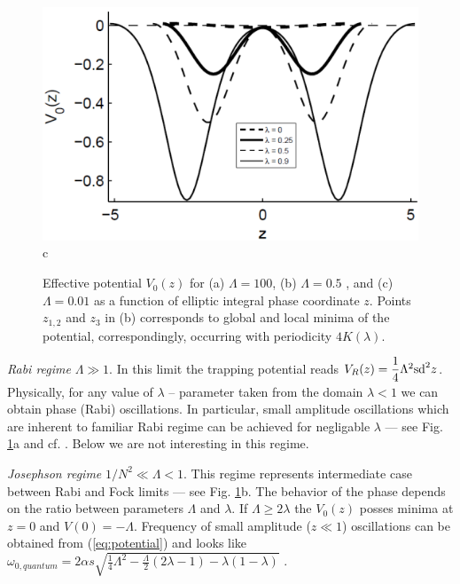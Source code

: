\documentclass[aps, pre, preprint, groupedaddress, superscriptaddress, showkeys, showpacs] {revtex4-1}
\begin{document}
\begin{figure}[ht]
\begin{minipage}[htbp]{0.32\linewidth}	{\includegraphics[width=1\linewidth]{pic/potential_L=001.png} \\ c}
\end{minipage}
\caption{
Effective potential $V_0(z)$ for (a) $\Lambda = 100$, (b) $\Lambda = 0.5$ , and (c) $\Lambda = 0.01$ as a function of  elliptic integral phase coordinate $z$.
Points $z_{1,2}$ and $z_{3}$ in (b) corresponds to global and local minima of the potential, correspondingly,  occurring with periodicity $4K(\lambda)$. \label{phase_potential}}
\end{figure}
%

\textit{Rabi regime} $\Lambda \gg 1$. In this limit the trapping potential reads $V_R(z) = \dfrac{1}{4} \Lambda^2 \textrm{sd}^2{z}$.
Physically, for any value of $\lambda$ -- parameter taken from the domain $\lambda <1$ we can obtain phase (Rabi) oscillations.
In particular, small amplitude oscillations which are inherent to familiar Rabi regime can be achieved for negligable $\lambda$ --- see Fig. \ref{phase_potential}a and cf. \cite{Anglin}.
Below we are not interesting in this regime. 

\textit{Josephson regime} $1/N^2\ll\Lambda <1$.
This regime represents intermediate case between Rabi and Fock limits --- see Fig. \ref{phase_potential}b.
The behavior of the phase depends on the ratio between parameters $\Lambda$ and $\lambda$.
If $\Lambda \ge 2\lambda$ the $V_0(z)$ posses minima at $z = 0$ and $V(0) = -\Lambda$.
Frequency of small amplitude ($z \ll 1$) oscillations can be obtained from (\ref{eq:potential}) and looks like { \red $\omega_{0, quantum} = 2 \alpha s \sqrt{\frac{1}{4} \Lambda^2 - \frac{\Lambda}{2} (2\lambda - 1) - \lambda(1 - \lambda)}$ }.
\end{document}
